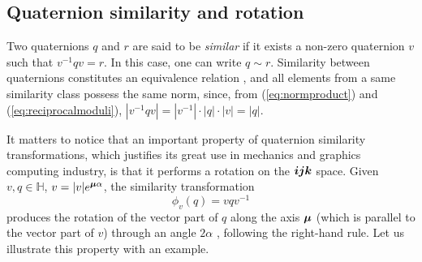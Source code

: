\subsection{Quaternion similarity and rotation}
\label{subsec:rotacionando}
Two quaternions $ q $ and $ r $ are said to be \emph{similar} if it exists a non-zero quaternion $ v $ such that $ v^{-1}q v = r $. In this case, one can write $ q \sim r $. Similarity between quaternions constitutes an equivalence relation \cite{zhang1997quaternions}, and all elements from a same similarity class possess the same norm, since, from (\ref{eq:normproduct}) and (\ref{eq:reciprocalmoduli}), $ |v^{-1}q v| = |v^{-1}| \cdot |q| \cdot |v| = |q| $.

It matters to notice that an important property of quaternion similarity transformations, which justifies its great use in mechanics and graphics computing industry, is that it performs a rotation on the $\boldsymbol{i} \boldsymbol{j} \boldsymbol{k}$ space. Given $ v,q \in \mathbb{H} $, $ v = |v| e^{\boldsymbol{\mu} \alpha}$, the similarity transformation
\begin{equation}
    \label{eq:rotacao}
    \phi_v(q) = v q v^{-1}
\end{equation}
produces the rotation of the vector part of $q$ along the axis $ \boldsymbol{\mu} $ (which is parallel to the vector part of $v$) through an angle $ 2\alpha $ \cite{ward2012quaternions}, following the right-hand rule. Let us illustrate this property with an example.

